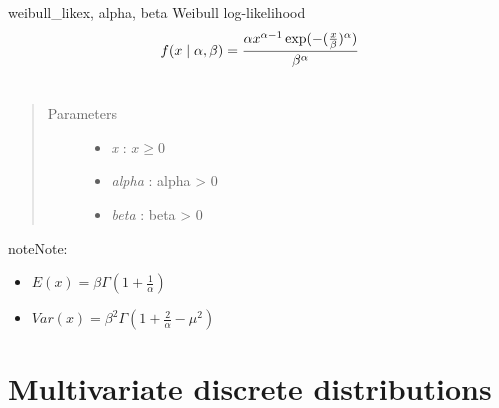 \hypertarget{pymc.distributions.weibull_like}{}\begin{funcdesc}{weibull\_like}{x, alpha, beta}
Weibull log-likelihood
\begin{gather}
\begin{split}f(x \mid \alpha, \beta) = \frac{\alpha x^{\alpha - 1}
\exp(-(\frac{x}{\beta})^{\alpha})}{\beta^\alpha}\end{split}\notag\\\begin{split}\end{split}\notag
\end{gather}\begin{quote}\begin{description}
\item[Parameters] \leavevmode\begin{itemize}
\item {} 
\emph{x} : $x \ge 0$

\item {} 
\emph{alpha} : alpha \textgreater{} 0

\item {} 
\emph{beta} : beta \textgreater{} 0

\end{itemize}

\end{description}\end{quote}

\begin{notice}{note}{Note:}\begin{itemize}
\item {} 
$E(x)=\beta \Gamma(1+\frac{1}{\alpha})$

\item {} 
$Var(x)=\beta^2 \Gamma(1+\frac{2}{\alpha} - \mu^2)$

\end{itemize}
\end{notice}
\end{funcdesc}


\section{Multivariate discrete distributions}

